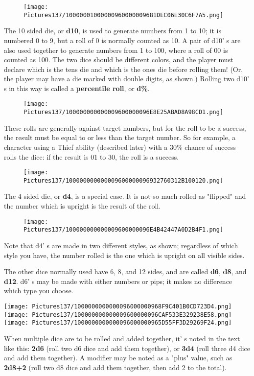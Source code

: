 \documentclass[a4paper,twoside,openany,10pt]{book}
\begin{document}
\begin{multicols}{2}
\begin{wrapfigure}{r}{1.77cm}
\texttt{[image: Pictures137/10000001000000960000009681DEC06E30C6F7A5.png]}
\end{wrapfigure}
The 10 sided die, or \textbf{d10}, is used to generate numbers from 1 to 10; it is numbered 0 to 9, but a roll of 0 is normally counted as 10. A pair of d10' s are also used together to generate numbers from 1 to 100, where a roll of 00 is counted as 100. The two dice should be different colors, and the player must declare which is the tens die and which is the ones die before rolling them! (Or, the player may have a die marked with double digits, as shown.) Rolling two d10' s in this way is called a \textbf{percentile roll}, or \textbf{d\%}.

\begin{wrapfigure}{r}{1.77cm}
	\texttt{[image: Pictures137/100000000000009600000096E8E25ABAD8A98CD1.png]}
\end{wrapfigure}
These rolls are generally against target numbers, but for the roll to be a success, the result must be equal to or less than the target number. So for example, a character using a Thief ability (described later) with a 30\% chance of success rolls the dice: if the result is 01 to 30, the roll is a success.
\begin{wrapfigure}{r}{1.77cm}
\texttt{[image: Pictures137/100000000000009600000096932760312B100120.png]}
\end{wrapfigure}

The 4 sided die, or \textbf{d4}, is a special case. It is not so much rolled as "flipped" and the number which is upright is the result of the roll.
\begin{wrapfigure}{r}{1.77cm}
\texttt{[image: Pictures137/100000000000009600000096E4B42447A0D2B4F1.png]}	
\end{wrapfigure}
Note that d4' s are made in two different styles, as shown; regardless of which style you have, the number rolled is the one which is upright on all visible sides.

The other dice normally used have 6, 8, and 12 sides, and are called \textbf{d6}, \textbf{d8}, and \textbf{d12}. d6' s may be made with either numbers or pips; it makes no difference which type you choose. 

\texttt{[image: Pictures137/1000000000000096000000968F9C401B0CD723D4.png]}
\texttt{[image: Pictures137/100000000000009600000096CAF533E329238E58.png]}
\texttt{[image: Pictures137/1000000000000096000000965D55FF3D29269F24.png]}

When multiple dice are to be rolled and added together, it' s noted in the text like this: \textbf{2d6} (roll two d6 dice and add them together), or  \textbf{3d4} (roll three d4 dice and add them together). A modifier may be noted as a "plus" value, such as \textbf{2d8+2} (roll two d8 dice and add them together, then add 2 to the total).

\end{multicols}
\end{document}

